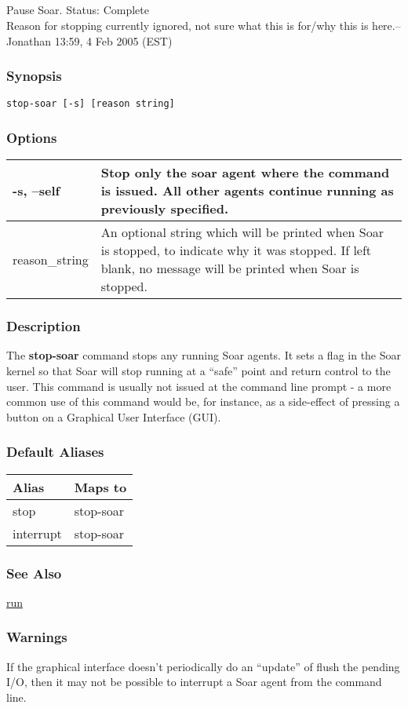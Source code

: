 \subsection{}
\label{stop-soar}
Pause Soar. 
 Status: Complete\\ 
Reason for stopping currently ignored, not sure what this is for/why this is here.--Jonathan 13:59, 4 Feb 2005 (EST) 
\subsubsection*{Synopsis}
\begin{verbatim}
stop-soar [-s] [reason string]
\end{verbatim}
\subsubsection*{Options}
\begin{tabular}{|l|l|}
\hline 
 -s, --self  & Stop only the soar agent where the command is issued. All other agents continue running as previously specified.  \\
 \hline 
 reason\_string  & An optional string which will be printed when Soar is stopped, to indicate why it was stopped. If left blank, no message will be printed when Soar is stopped.  \\
 \hline 
\end{tabular}
\subsubsection*{Description}
 The \textbf{stop-soar}
 command stops any running Soar agents. It sets a flag in the Soar kernel so that Soar will stop running at a ``safe'' point and return control to the user. This command is usually not issued at the command line prompt - a more common use of this command would be, for instance, as a side-effect of pressing a button on a Graphical User Interface (GUI). 
\subsubsection*{Default Aliases}
\begin{tabular}{|l|l|}
\hline 
 Alias  & Maps to  \\
 \hline 
 stop  & stop-soar  \\
 \hline 
 interrupt  & stop-soar  \\
 \hline 
\end{tabular}
\subsubsection*{See Also}
\hyperref[run]{run} \subsubsection*{Warnings}
 If the graphical interface doesn't periodically do an ``update'' of flush the pending I/O, then it may not be possible to interrupt a Soar agent from the command line. 
